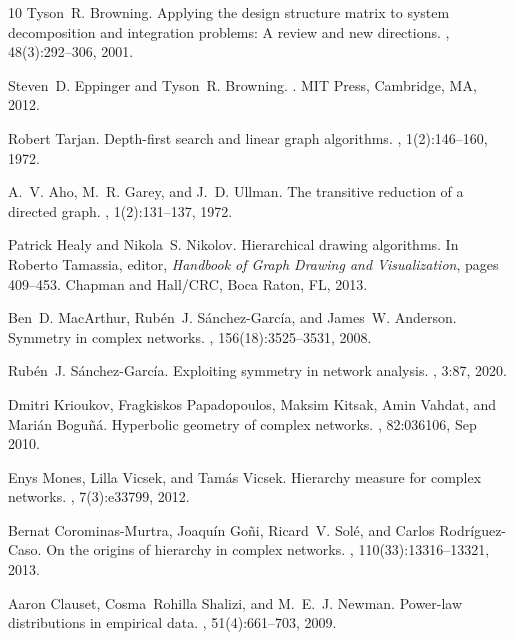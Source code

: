 \documentclass[11pt,a4paper]{article}
\begin{document}
\begin{thebibliography}{10}
Tyson~R. Browning.
\newblock Applying the design structure matrix to system decomposition and
  integration problems: A review and new directions.
, 48(3):292--306,
  2001.

Steven~D. Eppinger and Tyson~R. Browning.
.
\newblock MIT Press, Cambridge, MA, 2012.

Robert Tarjan.
\newblock Depth-first search and linear graph algorithms.
, 1(2):146--160, 1972.

A.~V. Aho, M.~R. Garey, and J.~D. Ullman.
\newblock The transitive reduction of a directed graph.
, 1(2):131--137, 1972.

Patrick Healy and Nikola~S. Nikolov.
\newblock Hierarchical drawing algorithms.
\newblock In Roberto Tamassia, editor, {\em Handbook of Graph Drawing and
  Visualization}, pages 409--453. Chapman and Hall/CRC, Boca Raton, FL, 2013.

Ben~D. MacArthur, Rub{\'e}n~J. S{\'a}nchez-Garc{\'i}a, and James~W. Anderson.
\newblock Symmetry in complex networks.
, 156(18):3525--3531, 2008.

Rub{\'e}n~J. S{\'a}nchez-Garc{\'i}a.
\newblock Exploiting symmetry in network analysis.
, 3:87, 2020.

Dmitri Krioukov, Fragkiskos Papadopoulos, Maksim Kitsak, Amin Vahdat, and
  Mari{\'a}n Bogu{\~n}{\'a}.
\newblock Hyperbolic geometry of complex networks.
, 82:036106, Sep 2010.

Enys Mones, Lilla Vicsek, and Tam{\'a}s Vicsek.
\newblock Hierarchy measure for complex networks.
, 7(3):e33799, 2012.

Bernat Corominas-Murtra, Joaqu{\'i}n Go{\~n}i, Ricard~V. Sol{\'e}, and Carlos
  Rodr{\'i}guez-Caso.
\newblock On the origins of hierarchy in complex networks.
,
  110(33):13316--13321, 2013.

Aaron Clauset, Cosma~Rohilla Shalizi, and M.~E.~J. Newman.
\newblock Power-law distributions in empirical data.
, 51(4):661--703, 2009.


\end{thebibliography}
\end{document}
